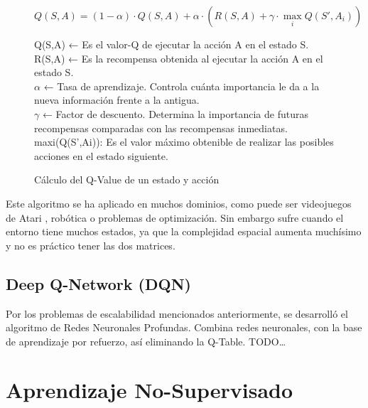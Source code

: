 		\begin{figure}
			
		
		\begin{flushleft}
		\begin{mdframed}[roundcorner=5pt]
			\[
			Q(S,A) = (1-\alpha) \cdot Q(S,A) + \alpha \cdot \left(R(S,A) + \gamma \cdot \max_{i} Q(S',A_i)\right)
			\]
			\begin{tcolorbox}[boxrule=0.5pt, fontupper=\small]
				\scriptsize
				Q(S,A) ← Es el valor-Q de ejecutar la acción A en el estado S.\\
				R(S,A) ← Es la recompensa obtenida al ejecutar la acción A en el estado S.\\
				$\alpha$ ← Tasa de aprendizaje. Controla cuánta importancia le da a la nueva información frente a la antigua.\\
				$\gamma$ ← Factor de descuento. Determina la importancia de futuras recompensas comparadas con las recompensas inmediatas.\\
				maxi(Q(S’,Ai)): Es el valor máximo obtenible de realizar las posibles acciones en el estado siguiente.
				
					
			\end{tcolorbox}
	
		
		\end{mdframed}		
		\end{flushleft}
		\caption{Cálculo del Q-Value de un estado y acción}	
		\label{fig:qvalue}
		\end{figure}

		
		Este algoritmo se ha aplicado en muchos dominios, como puede ser videojuegos de Atari \cite{mnih2013playing}, robótica o problemas de optimización. Sin embargo sufre cuando el entorno tiene muchos estados, ya que la complejidad espacial aumenta muchísimo y no es práctico tener las dos matrices.\\
		
	\subsection{Deep Q-Network (DQN)}
		Por los problemas de escalabilidad mencionados anteriormente, se desarrolló el algoritmo de Redes Neuronales Profundas. Combina redes neuronales, con la base de aprendizaje por refuerzo, así eliminando la Q-Table.
		\color{blue} TODO… \color{black}


\section{Aprendizaje No-Supervisado}

